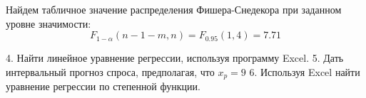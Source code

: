 \documentclass[aps,%
12pt,%
final,%
oneside,
onecolumn,%
musixtex, %
superscriptaddress,%
centertags]{article} %
\begin{document}
Найдем табличное значение распределения Фишера-Снедекора при заданном уровне значимости:
$$ F_{1-\alpha}(n-1-m,n) = F_{0.95}(1,4) = 7.71$$

4. Найти линейное уравнение регрессии, используя программу Excel.
5. Дать интервальный прогноз спроса, предполагая, что $x_p=9$
6. Используя Excel найти уравнение регрессии по степенной функции.
\end{document}
